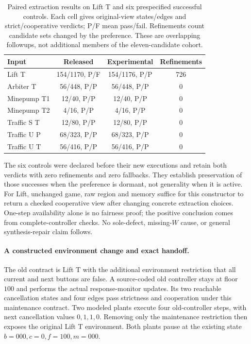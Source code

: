 \begin{table}[htbp]
\centering\small
\caption{Paired extraction results on Lift T and six prespecified
successful controls. Each cell gives original-view states/edges and
strict/cooperative verdicts; P/F mean pass/fail. Refinements count
candidate sets changed by the preference. These are overlapping
followups, not additional members of the eleven-candidate cohort.}
\label{tab:lift-choice-intervention}
\begin{tabular}{@{}lccc@{}}
\toprule
Input & Released & Experimental & Refinements\\
\midrule
Lift T & 154/1170, P/F & 154/1176, P/P & 726\\
Arbiter T & 56/448, P/P & 56/448, P/P & 0\\
Minepump T1 & 12/40, P/P & 12/40, P/P & 0\\
Minepump T2 & 4/16, P/P & 4/16, P/P & 0\\
Traffic S T & 12/80, P/P & 12/80, P/P & 0\\
Traffic U P & 68/323, P/P & 68/323, P/P & 0\\
Traffic U T & 56/416, P/P & 56/416, P/P & 0\\
\bottomrule
\end{tabular}
\end{table}

The six controls were declared before their new executions and retain
both verdicts with zero refinements and zero fallbacks. They establish
preservation of those successes when the preference is dormant, not
generality when it is active. For Lift, unchanged game, raw region and
memory suffice for this constructor to return a checked cooperative
view after changing concrete extraction choices. One-step availability alone is no
fairness proof; the positive conclusion comes from complete-controller
checks. No sole-defect, missing-$W$ cause, or general synthesis-repair
claim follows.

\paragraph{A constructed environment change and exact handoff.}
The old contract is Lift T with the additional environment restriction
that all current and next buttons are false. A source-coded old
controller stays at floor $100$ and performs the actual response-monitor
updates. Its two reachable cancellation states and four edges pass
strictness and cooperation under this maintenance contract.
Two modeled plants execute four old-controller steps, with next
cancellation values $0,1,1,0$. Removing only the maintenance restriction
then exposes the original Lift T environment. Both plants pause at
the existing state $b=000,c=0,f=100,m=000$.

